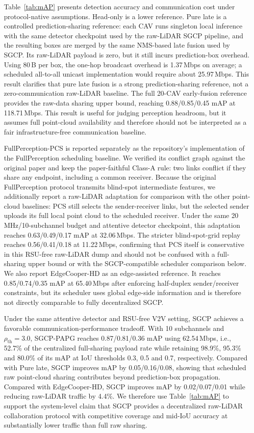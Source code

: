 \documentclass[conference]{IEEEtran}
\begin{document}
Table~\ref{tab:mAP} presents detection accuracy and communication cost under protocol-native assumptions. Head-only is a lower reference. Pure late is a controlled prediction-sharing reference: each CAV runs singleton local inference with the same detector checkpoint used by the raw-LiDAR SGCP pipeline, and the resulting boxes are merged by the same NMS-based late fusion used by SGCP. Its raw-LiDAR payload is zero, but it still incurs prediction-box overhead. Using 80\,B per box, the one-hop broadcast overhead is 1.37\,Mbps on average; a scheduled all-to-all unicast implementation would require about 25.97\,Mbps. This result clarifies that pure late fusion is a strong prediction-sharing reference, not a zero-communication raw-LiDAR baseline. The full 20-CAV early-fusion reference provides the raw-data sharing upper bound, reaching 0.88/0.85/0.45 mAP at 118.71\,Mbps. This result is useful for judging perception headroom, but it assumes full point-cloud availability and therefore should not be interpreted as a fair infrastructure-free communication baseline.

FullPerception-PCS is reported separately as the repository's implementation of the FullPerception scheduling baseline. We verified its conflict graph against the original paper and keep the paper-faithful Class-A rule: two links conflict if they share any endpoint, including a common receiver. Because the original FullPerception protocol transmits blind-spot intermediate features, we additionally report a raw-LiDAR adaptation for comparison with the other point-cloud baselines: PCS still selects the sender-receiver links, but the selected sender uploads its full local point cloud to the scheduled receiver. Under the same 20\,MHz/10-subchannel budget and attentive detector checkpoint, this adaptation reaches 0.63/0.49/0.17 mAP at 32.06\,Mbps. The stricter blind-spot-grid replay reaches 0.56/0.41/0.18 at 11.22\,Mbps, confirming that PCS itself is conservative in this RSU-free raw-LiDAR dump and should not be confused with a full-sharing upper bound or with the SGCP-compatible scheduler comparison below. We also report EdgeCooper-HD as an edge-assisted reference. It reaches 0.85/0.74/0.35 mAP at 65.40\,Mbps after enforcing half-duplex sender/receiver constraints, but its scheduler uses global edge-side information and is therefore not directly comparable to fully decentralized SGCP.

Under the same attentive detector and RSU-free V2V setting, SGCP achieves a favorable communication-performance tradeoff. With 10 subchannels and $\rho_{\mathrm{th}}=3.0$, SGCP-PAPG reaches 0.87/0.81/0.36 mAP using 62.54\,Mbps, i.e., 52.7\% of the centralized full-sharing payload rate while retaining 98.9\%, 95.3\% and 80.0\% of its mAP at IoU thresholds 0.3, 0.5 and 0.7, respectively. Compared with Pure late, SGCP improves mAP by 0.05/0.16/0.08, showing that scheduled raw point-cloud sharing contributes beyond prediction-box propagation. Compared with EdgeCooper-HD, SGCP improves mAP by 0.02/0.07/0.01 while reducing raw-LiDAR traffic by 4.4\%. We therefore use Table~\ref{tab:mAP} to support the system-level claim that SGCP provides a decentralized raw-LiDAR collaboration protocol with competitive coverage and mid-IoU accuracy at substantially lower traffic than full raw sharing.
\end{document}
